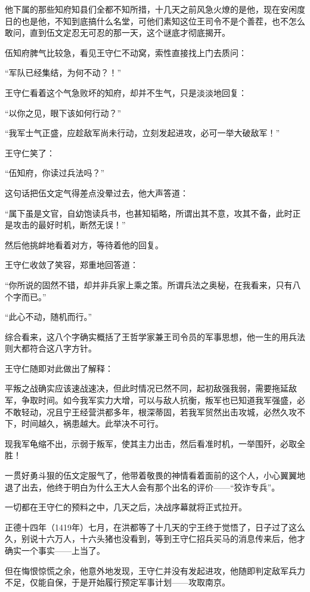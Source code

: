 \begin{multicols}{\theparacolNo}
他下属的那些知府知县们全都不知所措，十几天之前风急火燎的是他，现在安闲度日的也是他，不知到底搞什么名堂，可他们素知这位王司令不是个善茬，也不怎么敢问，直到伍文定忍无可忍的那一天，这个谜底才彻底揭开。

伍知府脾气比较急，看见王守仁不动窝，索性直接找上门去质问：

“军队已经集结，为何不动？！”

王守仁看着这个气急败坏的知府，却并不生气，只是淡淡地回复：

“以你之见，眼下该如何行动？”

“我军士气正盛，应趁敌军尚未行动，立刻发起进攻，必可一举大破敌军！”

王守仁笑了：

“伍知府，你读过兵法吗？”

这句话把伍文定气得差点没晕过去，他大声答道：

“属下虽是文官，自幼饱读兵书，也甚知韬略，所谓出其不意，攻其不备，此时正是攻击的最好时机，断然无误！”

然后他挑衅地看着对方，等待着他的回复。

王守仁收敛了笑容，郑重地回答道：

“你所说的固然不错，却并非兵家上乘之策。所谓兵法之奥秘，在我看来，只有八个字而已。”

“此心不动，随机而行。”

综合看来，这八个字确实概括了王哲学家兼王司令员的军事思想，他一生的用兵法则大都符合这八字方针。

王守仁随即对此做出了解释：

平叛之战确实应该速战速决，但此时情况已然不同，起初敌强我弱，需要拖延敌军，争取时间。如今我军实力大增，可以与敌人抗衡，叛军也已知道我军强盛，必不敢轻动，况且宁王经营洪都多年，根深蒂固，若我军贸然出击攻城，必然久攻不下，时间越久，祸患越大。此举决不可行。

现我军龟缩不出，示弱于叛军，使其主力出击，然后看准时机，一举围歼，必取全胜！

一贯好勇斗狠的伍文定服气了，他带着敬畏的神情看着面前的这个人，小心翼翼地退了出去，他终于明白为什么王大人会有那个出名的评价——“狡诈专兵”。

一切都在王守仁的预料之中，几天之后，决战序幕就将正式拉开。

正德十四年（1419年）七月，在洪都等了十几天的宁王终于觉悟了，日子过了这么久，别说十六万人，十六头猪也没看到，等到王守仁招兵买马的消息传来后，他才确实一个事实——上当了。

但在悔恨惊慌之余，他意外地发现，王守仁并没有发起进攻，他随即判定敌军兵力不足，仅能自保，于是开始履行预定军事计划——攻取南京。


\end{multicols}
